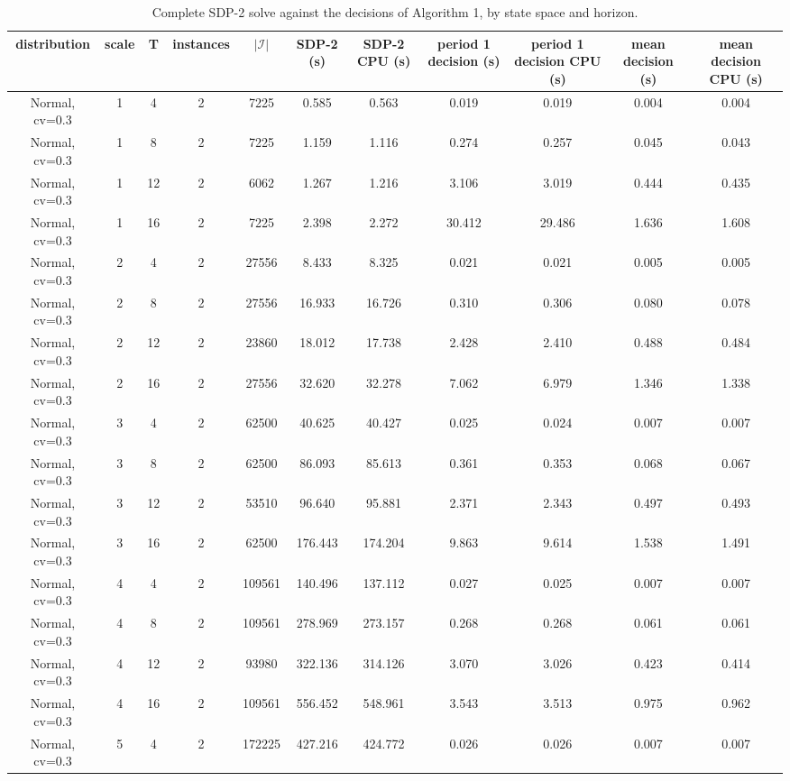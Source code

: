 \begin{table}[H]
\centering
\caption{Complete SDP-2 solve against the decisions of Algorithm 1, by state space and horizon.}
\label{tab:test2_Q3_time}
\begin{tabular}{ccccccccccc}
\toprule
distribution & scale & T & instances & $|\mathcal{I}|$ & SDP-2 (s) & SDP-2 CPU (s) & period 1 decision (s) & period 1 decision CPU (s) & mean decision (s) & mean decision CPU (s) \\
\midrule
Normal, cv=0.3 & 1 & 4 & 2 & 7225 & 0.585 & 0.563 & 0.019 & 0.019 & 0.004 & 0.004 \\
Normal, cv=0.3 & 1 & 8 & 2 & 7225 & 1.159 & 1.116 & 0.274 & 0.257 & 0.045 & 0.043 \\
Normal, cv=0.3 & 1 & 12 & 2 & 6062 & 1.267 & 1.216 & 3.106 & 3.019 & 0.444 & 0.435 \\
Normal, cv=0.3 & 1 & 16 & 2 & 7225 & 2.398 & 2.272 & 30.412 & 29.486 & 1.636 & 1.608 \\
Normal, cv=0.3 & 2 & 4 & 2 & 27556 & 8.433 & 8.325 & 0.021 & 0.021 & 0.005 & 0.005 \\
Normal, cv=0.3 & 2 & 8 & 2 & 27556 & 16.933 & 16.726 & 0.310 & 0.306 & 0.080 & 0.078 \\
Normal, cv=0.3 & 2 & 12 & 2 & 23860 & 18.012 & 17.738 & 2.428 & 2.410 & 0.488 & 0.484 \\
Normal, cv=0.3 & 2 & 16 & 2 & 27556 & 32.620 & 32.278 & 7.062 & 6.979 & 1.346 & 1.338 \\
Normal, cv=0.3 & 3 & 4 & 2 & 62500 & 40.625 & 40.427 & 0.025 & 0.024 & 0.007 & 0.007 \\
Normal, cv=0.3 & 3 & 8 & 2 & 62500 & 86.093 & 85.613 & 0.361 & 0.353 & 0.068 & 0.067 \\
Normal, cv=0.3 & 3 & 12 & 2 & 53510 & 96.640 & 95.881 & 2.371 & 2.343 & 0.497 & 0.493 \\
Normal, cv=0.3 & 3 & 16 & 2 & 62500 & 176.443 & 174.204 & 9.863 & 9.614 & 1.538 & 1.491 \\
Normal, cv=0.3 & 4 & 4 & 2 & 109561 & 140.496 & 137.112 & 0.027 & 0.025 & 0.007 & 0.007 \\
Normal, cv=0.3 & 4 & 8 & 2 & 109561 & 278.969 & 273.157 & 0.268 & 0.268 & 0.061 & 0.061 \\
Normal, cv=0.3 & 4 & 12 & 2 & 93980 & 322.136 & 314.126 & 3.070 & 3.026 & 0.423 & 0.414 \\
Normal, cv=0.3 & 4 & 16 & 2 & 109561 & 556.452 & 548.961 & 3.543 & 3.513 & 0.975 & 0.962 \\
Normal, cv=0.3 & 5 & 4 & 2 & 172225 & 427.216 & 424.772 & 0.026 & 0.026 & 0.007 & 0.007 \\

\end{tabular}
\end{table}
